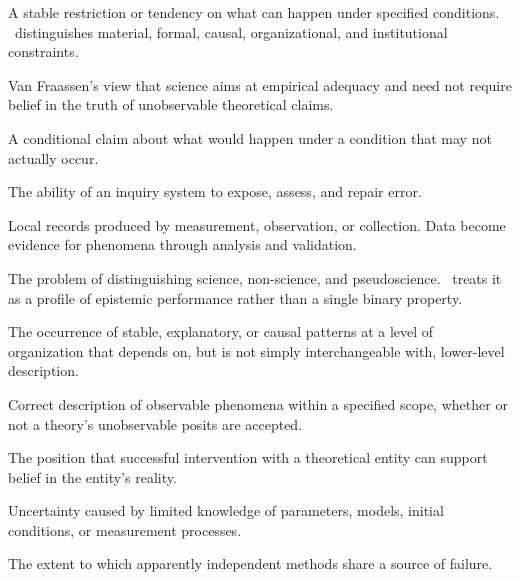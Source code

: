 \begin{description}[style=nextline,leftmargin=0pt,labelindent=0pt,labelwidth=0pt]
\item[Constraint.] A stable restriction or tendency on what can happen under
specified conditions. \RCR\ distinguishes material, formal, causal,
organizational, and institutional constraints.

\item[Constructive empiricism.] Van Fraassen's view that science aims at
empirical adequacy and need not require belief in the truth of unobservable
theoretical claims.

\item[Counterfactual.] A conditional claim about what would happen under a
condition that may not actually occur.

\item[Correction capacity.] The ability of an inquiry system to expose, assess,
and repair error.

\item[Data.] Local records produced by measurement, observation, or collection.
Data become evidence for phenomena through analysis and validation.

\item[Demarcation.] The problem of distinguishing science, non-science, and
pseudoscience. \RCR\ treats it as a profile of epistemic performance rather
than a single binary property.

\item[Emergence.] The occurrence of stable, explanatory, or causal patterns at a
level of organization that depends on, but is not simply interchangeable with,
lower-level description.

\item[Empirical adequacy.] Correct description of observable phenomena within a
specified scope, whether or not a theory's unobservable posits are accepted.

\item[Entity realism.] The position that successful intervention with a
theoretical entity can support belief in the entity's reality.

\item[Epistemic uncertainty.] Uncertainty caused by limited knowledge of
parameters, models, initial conditions, or measurement processes.

\item[Error correlation.] The extent to which apparently independent methods
share a source of failure.


\end{description}

